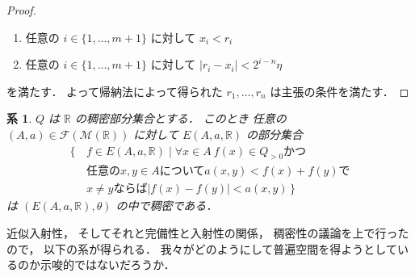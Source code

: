 \documentclass[leqno, 12pt]{jsarticle}
\newtheorem{cor}[thm]{系}
\newcommand{\rr}{\mathbb{R}}
\begin{document}
\begin{proof}
\begin{enumerate}
\item 
任意の
$i\in \{1, \dots, m+1\}$
に対して
$x_{i}<  r_{i}$
\item 
任意の
$i\in \{1, \dots, m+1\}$
に対して
$|r_{i}-x_{i}|<2^{i-n}\eta$
\end{enumerate}
を満たす．
よって帰納法によって得られた
$r_{1}, \dots, r_{n}$
は主張の条件を満たす．
\end{proof}



\begin{cor}\label{cor:katetov:dense}
$Q$
は
$\rr$
の稠密部分集合とする．
このとき
任意の
$(A, a)\in \mathscr{F}(\mathscr{M}(\rr))$
に対して
$E(A, a, \rr)$
の部分集合
\begin{align*}
\{\, &f\in E(A, a, \rr)\mid \text{$\forall x\in A\ f(x)\in Q_{>0}$かつ}\\
&\text{
任意の
$x, y\in A$について
$a(x, y)<f(x)+f(y)$で}\\
&\text{
$x\neq y$
ならば
$|f(x)-f(y)|<a(x, y)$
}
\, \}
\end{align*}
は
$(E(A, a, \rr), \theta)$
の中で稠密である．
\end{cor}



近似入射性，
そしてそれと完備性と入射性の関係，
稠密性の議論を上で行ったので，
以下の系が得られる．
我々がどのようにして普遍空間を得ようとしているのか示唆的ではないだろうか．
\end{document}
